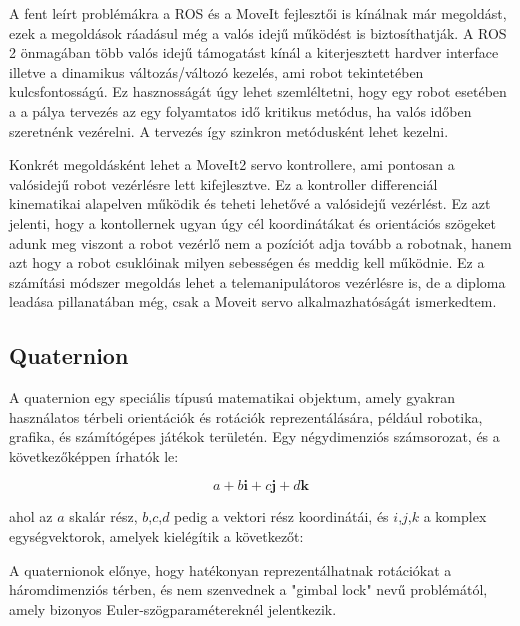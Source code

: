 A fent leírt problémákra a ROS és a MoveIt fejlesztői is kínálnak már megoldást, ezek a megoldások ráadásul még a valós idejű működést is biztosíthatják. A ROS 2 önmagában több valós idejű támogatást kínál a kiterjesztett hardver interface illetve a dinamikus változás/változó kezelés, ami robot tekintetében kulcsfontosságú. Ez hasznosságát úgy lehet szemléltetni, hogy egy robot esetében a a pálya tervezés az egy folyamtatos idő kritikus metódus, ha valós időben szeretnénk vezérelni. A tervezés így szinkron metódusként lehet kezelni.


Konkrét megoldásként lehet a MoveIt2 servo kontrollere, ami pontosan a valósidejű robot vezérlésre lett kifejlesztve. Ez a kontroller differenciál kinematikai alapelven működik és teheti lehetővé a valósidejű vezérlést. Ez azt jelenti, hogy a kontollernek ugyan úgy cél koordinátákat és orientációs szögeket adunk meg viszont a robot vezérlő nem a pozíciót adja tovább a robotnak, hanem azt hogy a robot csuklóinak milyen sebességen és meddig kell működnie. Ez a számítási módszer megoldás lehet a telemanipulátoros vezérlésre is, de a diploma leadása pillanatában még, csak a Moveit servo alkalmazhatóságát ismerkedtem.

\subsection{Quaternion}
A quaternion egy speciális típusú matematikai objektum, amely gyakran használatos térbeli orientációk és rotációk reprezentálására, például robotika, grafika, és számítógépes játékok területén. Egy négydimenziós számsorozat, és a következőképpen írhatók le:

\begin{equation}
a + b \textbf{i} + c \textbf{j} + d \textbf{k} 
\end{equation}

ahol az $a$ skalár rész, $b$,$c$,$d$ pedig a vektori rész koordinátái, és $i$,$j$,$k$ a komplex egységvektorok, amelyek kielégítik a következőt: 

A quaternionok előnye, hogy hatékonyan reprezentálhatnak rotációkat a háromdimenziós térben, és nem szenvednek a "gimbal lock" nevű problémától, amely bizonyos Euler-szögparamétereknél jelentkezik.

